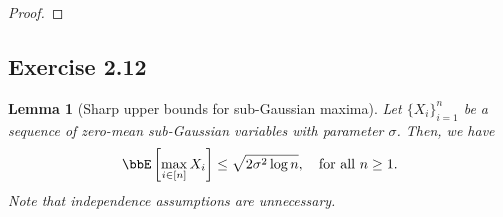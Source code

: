\documentclass[11pt]{article}
\newcommand{\off}[1]{\left[#1\right]}
\theoremstyle{plain}
\newtheorem{lem}{Lemma}
\theoremstyle{definition}
\begin{document}
\begin{proof}
	 \iffalse
	 \vspace{0.2cm}
	 Next, we prove the equation~\eqref{eq:e2112}.
	 
	 \vspace{0.2cm}
	 
	 By Markov's inequality, the expectation of $Z_n$ satisfies
	 \begin{equation}
	 	\bbE[Z_n] \geq t \bbP[Z_n \geq t],\quad \text{for all }t \geq 0.
	 \end{equation}
	 By the independence of $\{X_i\}_{i=1}^n$, the tail probability of $Z_n$ is
	 \begin{equation}
	 	\bbP[Z_n \geq t] = 1 - (1 - \bbP(|X_1| \geq t))^n.
	 \end{equation}
	 
	 Let $t = \sqrt{2\sigma^2 \log n}$. By equation~\eqref{eq:e211proupper}, the tail probability of $X_1$ satisfies
	 \begin{equation}
	 	\bbP(|X_1| \geq \sqrt{2\sigma^2 \log n}) \leq \frac{2}{\sqrt{ \pi \log n}} \frac{1}{n} \leq \frac{1}{n},\quad \text{for all } n \geq 5.
	 \end{equation}	 
	 Hence, the tail probability of $Z_n$ with $t = \sqrt{2\sigma^2 \log n} $satisfies
	 \begin{equation}
	 	\bbP[Z_n \geq t] \geq 1 - 
	 \end{equation}
	 \fi
\end{proof}

\subsection{Exercise 2.12}
\begin{lem}[Sharp upper bounds for sub-Gaussian maxima]
	Let $\{X_i\}_{i = 1}^n$ be a sequence of zero-mean sub-Gaussian variables with parameter $\sigma$. Then, we have
	\begin{equation}
		\bbE \off{\max_{i \in [n]} X_i} \leq \sqrt{2\sigma^2 \log n}, \quad \text{for all } n \geq 1.
	\end{equation}
	Note that independence assumptions are unnecessary.
\end{lem}
\end{document}
